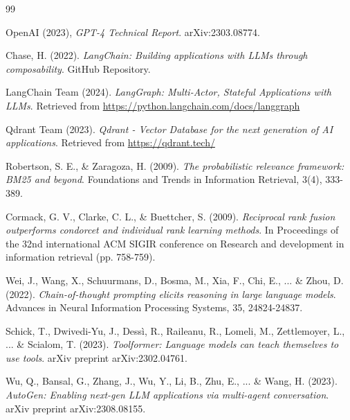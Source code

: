 \begin{thebibliography}{99}

 OpenAI (2023), \textit{GPT-4 Technical Report}. arXiv:2303.08774.

 Chase, H. (2022). \textit{LangChain: Building applications with LLMs through composability}. GitHub Repository.

 LangChain Team (2024). \textit{LangGraph: Multi-Actor, Stateful Applications with LLMs}. Retrieved from \url{https://python.langchain.com/docs/langgraph}

 Qdrant Team (2023). \textit{Qdrant - Vector Database for the next generation of AI applications}. Retrieved from \url{https://qdrant.tech/}

 Robertson, S. E., \& Zaragoza, H. (2009). \textit{The probabilistic relevance framework: BM25 and beyond}. Foundations and Trends in Information Retrieval, 3(4), 333-389.

 Cormack, G. V., Clarke, C. L., \& Buettcher, S. (2009). \textit{Reciprocal rank fusion outperforms condorcet and individual rank learning methods}. In Proceedings of the 32nd international ACM SIGIR conference on Research and development in information retrieval (pp. 758-759).

 Wei, J., Wang, X., Schuurmans, D., Bosma, M., Xia, F., Chi, E., ... \& Zhou, D. (2022). \textit{Chain-of-thought prompting elicits reasoning in large language models}. Advances in Neural Information Processing Systems, 35, 24824-24837.

 Schick, T., Dwivedi-Yu, J., Dessì, R., Raileanu, R., Lomeli, M., Zettlemoyer, L., ... \& Scialom, T. (2023). \textit{Toolformer: Language models can teach themselves to use tools}. arXiv preprint arXiv:2302.04761.

 Wu, Q., Bansal, G., Zhang, J., Wu, Y., Li, B., Zhu, E., ... \& Wang, H. (2023). \textit{AutoGen: Enabling next-gen LLM applications via multi-agent conversation}. arXiv preprint arXiv:2308.08155.

\end{thebibliography}